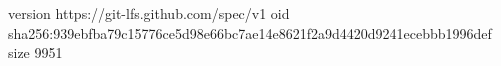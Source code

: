 version https://git-lfs.github.com/spec/v1
oid sha256:939ebfba79c15776ce5d98e66bc7ae14e8621f2a9d4420d9241ecebbb1996def
size 9951
